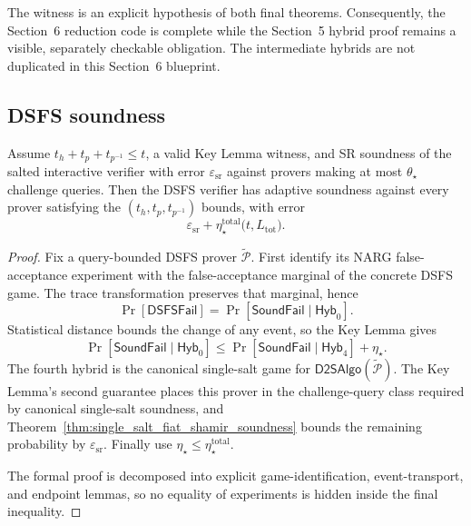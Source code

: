 The witness is an explicit hypothesis of both final theorems.  Consequently, the Section~6
reduction code is complete while the Section~5 hybrid proof remains a visible, separately
checkable obligation.  The intermediate hybrids are not duplicated in this Section~6 blueprint.

\subsection{DSFS soundness}

\begin{theorem}
  \label{thm:duplex_sponge_fiat_shamir_soundness}
  Assume $t_h+t_p+t_{p^{-1}}\leq t$, a valid Key Lemma witness, and SR soundness of the salted
  interactive verifier with error $\varepsilon_{\mathrm{sr}}$ against provers making at most
  $\theta_{\star}$ challenge queries.  Then the DSFS verifier has adaptive soundness against every
  prover satisfying the $(t_h,t_p,t_{p^{-1}})$ bounds, with error
  \[
    \varepsilon_{\mathrm{sr}}
      +\eta_{\star}^{\mathrm{total}}
        \bigl(t,L_{\mathrm{tot}}\bigr).
  \]
  \leanok
\end{theorem}

\begin{proof}
  Fix a query-bounded DSFS prover $\widetilde{\mathcal P}$.  First identify its NARG
  false-acceptance experiment with the false-acceptance marginal of the concrete DSFS game.  The
  trace transformation preserves that marginal, hence
  \[
    \Pr[\mathsf{DSFSFail}]
      =\Pr[\mathsf{SoundFail}\mid\mathsf{Hyb}_0].
  \]
  Statistical distance bounds the change of any event, so the Key Lemma gives
  \[
    \Pr[\mathsf{SoundFail}\mid\mathsf{Hyb}_0]
      \leq
    \Pr[\mathsf{SoundFail}\mid\mathsf{Hyb}_4]
      +\eta_{\star}.
  \]
  The fourth hybrid is the canonical single-salt game for
  $\mathsf{D2SAlgo}(\widetilde{\mathcal P})$.  The Key Lemma's second guarantee places this prover
  in the challenge-query class required by canonical single-salt soundness, and
  Theorem~\ref{thm:single_salt_fiat_shamir_soundness} bounds the remaining probability by
  $\varepsilon_{\mathrm{sr}}$.  Finally use
  $\eta_{\star}\leq\eta_{\star}^{\mathrm{total}}$.

  The formal proof is decomposed into explicit game-identification, event-transport, and endpoint
  lemmas, so no equality of experiments is hidden inside the final inequality.
  \leanok
\end{proof}

